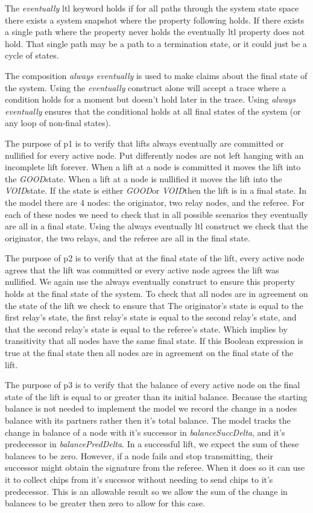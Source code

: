 \documentclass[runningheads]{llncs}
\newcommand{\void}{\emph{VOID}}
\newcommand{\good}{\emph{GOOD}}
\begin{document}

The \emph{eventually} ltl keyword holds if for all paths through the system state space there exists a system snapshot where the property following holds. If there exists a single path where the property never holds the eventually ltl property does not hold. That single path may be a path to a termination state, or it could just be a cycle of states. 

The composition \emph{always eventually} is used to make claims about the final state of the system. Using the \emph{eventually} construct alone will accept a trace where a condition holds for a moment but doesn't hold later in the trace. Using \emph{always eventually} ensures that the conditional holds at all final states of the system (or any loop of non-final states). 

The purpose of p1 is to verify that lifts always eventually are committed or nullified for every active node. Put differently nodes are not left hanging with an incomplete lift forever. 
When a lift at a node is committed it moves the lift into the \good state. When a lift at a node is nullified it moves the lift into the \void state. If the state is either \good or \void then the lift is in a final state. In the model there are 4 nodes: the originator, two relay nodes, and the referee. For each of these nodes we need to check that in all possible scenarios they eventually are all in a final state. Using the always eventually ltl construct we check that the originator, the two relays, and the referee are all in the final state. 

The purpose of p2 is to verify that at the final state of the lift, every active node agrees that the lift was committed or every active node agrees the lift was nullified. We again use the always eventually construct to ensure this property holds at the final state of the system. To check that all nodes are in agreement on the state of the lift we check to ensure that The originator's state is equal to the first relay's state, the first relay's state is equal to the second relay's state, and that the second relay's state is equal to the referee's state. Which implies by transitivity that all nodes have the same final state. If this Boolean expression is true at the final state then all nodes are in agreement on the final state of the lift.

The purpose of p3 is to verify that the balance of every active node on the final state of the lift is equal to or greater than its initial balance. Because the starting balance is not needed to implement the model we record the change in a nodes balance with its partners rather then it's total balance. The model tracks the change in balance of a node with it's successor in \emph{balanceSuccDelta}, and it's predecessor in \emph{balancePredDelta}. In a successful lift, we expect the sum of these balances to be zero. However, if a node fails and stop transmitting, their successor might obtain the signature from the referee. When it does so it can use it to collect chips from it's succssor without needing to send chips to it's predecessor. This is an allowable result so we allow the sum of the change in balances to be greater then zero to allow for this case.
\end{document}
